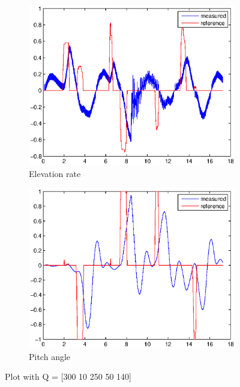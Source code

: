 \begin{figure}[H]
\graphicspath{ {Part3_pictures/}}
\begin{subfigure}{0.5\textwidth}
    \includegraphics[width=0.9\linewidth]{Part3_pictures/p3p3/Q2elevation.eps} 
    \caption{Elevation rate}
\end{subfigure}
\begin{subfigure}{0.5\textwidth}
    \includegraphics[width=0.9\linewidth]{Part3_pictures/p3p3/Q2pitch.eps}
    \caption{Pitch angle}
\end{subfigure}
\caption{Plot with Q = [300 10 250 50 140]}
\end{figure}

